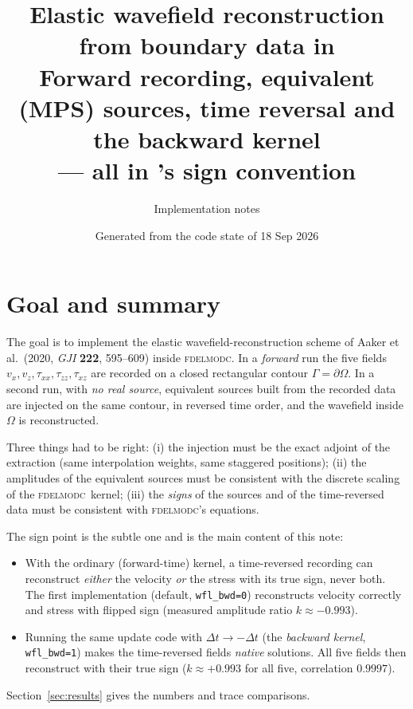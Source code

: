 \documentclass[11pt,a4paper]{article}
\title{Elastic wavefield reconstruction from boundary data in \fd\\[2pt]
\large Forward recording, equivalent (MPS) sources, time reversal and the backward kernel\\
--- all in \fd's sign convention}
\author{Implementation notes}
\date{Generated from the code state of 18 Sep 2026}
\newcommand{\fd}{\textsc{fdelmodc}}
\begin{document}
\maketitle
\tableofcontents

\section{Goal and summary}
The goal is to implement the elastic wavefield-reconstruction scheme of
Aaker et al.\ (2020, \emph{GJI} \textbf{222}, 595--609) inside \fd. In a
\emph{forward} run the five fields $v_x,v_z,\tau_{xx},\tau_{zz},\tau_{xz}$ are
recorded on a closed rectangular contour $\Gamma=\partial\Omega$. In a second
run, with \emph{no real source}, equivalent sources built from the recorded
data are injected on the same contour, in reversed time order, and the wavefield
inside $\Omega$ is reconstructed.

Three things had to be right: (i) the injection must be the exact adjoint of
the extraction (same interpolation weights, same staggered positions);
(ii) the amplitudes of the equivalent sources must be consistent with the
discrete scaling of the \fd\ kernel; (iii) the \emph{signs} of the sources and
of the time-reversed data must be consistent with \fd's equations.

The sign point is the subtle one and is the main content of this note:

\begin{itemize}[leftmargin=1.2em]
\item With the ordinary (forward-time) kernel, a time-reversed recording can
  reconstruct \emph{either} the velocity \emph{or} the stress with its true sign,
  never both. The first implementation (default, \texttt{wfl\_bwd=0}) reconstructs
  velocity correctly and stress with flipped sign (measured amplitude ratio
  $k\approx-0.993$).
\item Running the same update code with $\Delta t\to-\Delta t$ (the
  \emph{backward kernel}, \texttt{wfl\_bwd=1}) makes the time-reversed fields
  \emph{native} solutions. All five fields then reconstruct with their true sign
  ($k\approx+0.993$ for all five, correlation $0.9997$).
\end{itemize}

Section~\ref{sec:results} gives the numbers and trace comparisons.

\end{document}
